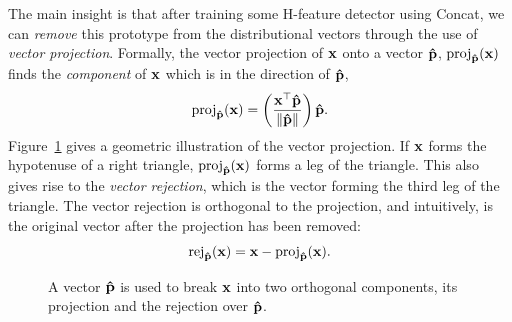 The main insight is that after training some H-feature detector using Concat,
we can {\em remove} this prototype from the distributional vectors through
the use of {\em vector projection}.
Formally, the vector projection of ${\mathbf{x}}$ onto
a vector ${\mathbf{\hat p}}$, $\text{proj}_{{\mathbf{\hat p}}}({\mathbf{x}})$ finds the {\em component} of ${\mathbf{x}}$
which is in the direction of ${\mathbf{\hat p}}$,
\begin{equation*}
  \text{proj}_{{\mathbf{\hat p}}}({\mathbf{x}}) = \left(\frac{{\mathbf{x}}^{\top}{\mathbf{\hat p}}}{\|{\mathbf{\hat p}}\|}\right){\mathbf{\hat p}}.
\end{equation*}
Figure~\ref{fig:vecproj} gives a geometric illustration of the vector
projection. If ${\mathbf{x}}$ forms the hypotenuse of a right
triangle, $\text{proj}_{{\mathbf{\hat p}}}({\mathbf{x}})$ forms a leg of the triangle. This also
gives rise to the {\em vector rejection}, which is the vector forming the third
leg of the triangle. The vector rejection is orthogonal to the projection, and
intuitively, is the original vector after the projection has been removed:
\begin{equation*}
  \text{rej}_{{\mathbf{\hat p}}}({\mathbf{x}}) = {\mathbf{x}} - \text{proj}_{{\mathbf{\hat p}}}({\mathbf{x}}).
\end{equation*}

\begin{figure}
\centering
{}
\caption{A vector ${\mathbf{\hat p}}$ is used to break ${\mathbf{x}}$ into two orthogonal components,
its projection and the rejection over ${\mathbf{\hat p}}$.}
\label{fig:vecproj}
\end{figure}

